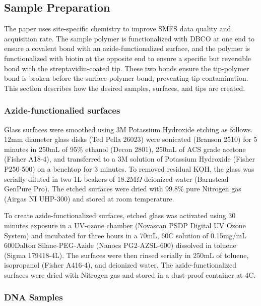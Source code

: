 \documentclass[%
  aip,12pt,tightenlines,
  amsthm,
 amsmath,amssymb
]{article}
\newcommand{\sLabel}[1]{\label{section:#1}}
\newcommand{\firstp}[0]{}
\newcommand{\pl}[0]{\vspace{6pt}}
\newcommand{\supply}[2]{(#1 #2)}
\newcommand{\singlemol}[0]{SMFS}
\newcommand{\degreeC}[0]{\degree{}C}
\begin{document}
\subsection{Sample Preparation}

The paper uses site-specific chemistry to improve \singlemol{} data quality and acquisition rate. The sample polymer is functionalized with DBCO at one end to ensure a covalent bond with an azide-functionalized surface, and the polymer is functionalized with biotin at the opposite end to ensure a specific but reversible bond with the streptavidin-coated tip. These two bonds ensure the tip-polymer bond is broken before the surface-polymer bond, preventing tip contamination. This section describes how the desired samples, surfaces, and tips are created.

\subsubsection{\sLabel{Surface}Azide-functionalied surfaces}

\firstp Glass surfaces were smoothed using 3M Potassium Hydroxide etching as follows. 12mm diameter glass disks \supply{Ted Pella}{26023} were sonicated \supply{Branson}{2510} for 5 minutes in 250mL of 95\% ethanol \supply{Decon}{2801}, 250mL of ACS grade acetone \supply{Fisher}{A18-4}, and transferred to a 3M solution of Potassium Hydroxide \supply{Fisher}{P250-500} on a benchtop for 3 minutes. To removed residual KOH, the glass was serially diluted in two 1L beakers of 18.2M$\Omega$ deionized water \supply{Barnstead}{GenPure Pro}. The etched surfaces were dried with 99.8\% pure Nitrogen gas \supply{Airgas}{NI UHP-300} and stored at room temperature. \pl

To create azide-functionalized surfaces, etched glass was activated using 30 minutes exposure in a UV-ozone chamber \supply{Novascan}{PSDP Digital UV Ozone System} and incubated for three hours in a 70mL, 60\degreeC{} solution of 0.15mg/mL 600Dalton Silane-PEG-Azide \supply{Nanocs}{PG2-AZSL-600} dissolved in toluene \supply{Sigma}{179418-4L}. The surfaces were then rinsed serially in 250mL of toluene, isopropanol \supply{Fisher}{A416-4}, and deionized water. The azide-functionalized surfaces were dried with Nitrogen gas and stored in a dust-proof container at 4\degreeC{}. \pl 

\subsubsection{\sLabel{Sample}DNA Samples}
\end{document}
